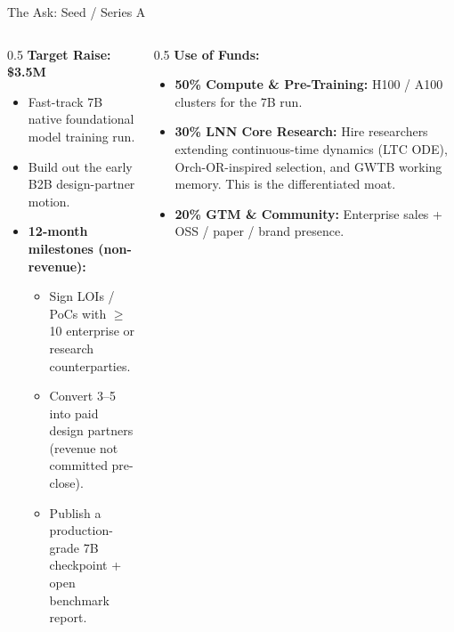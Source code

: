 ﻿\documentclass[aspectratio=169, 10pt]{beamer}
\begin{document}
\begin{frame}{The Ask: Seed / Series A}
\begin{columns}
\begin{column}{0.5\textwidth}
\textbf{Target Raise: \$3.5M}
\vspace{0.5em}
\begin{itemize}
    \item Fast-track 7B native foundational model training run.
    \item Build out the early B2B design-partner motion.
    \item \textbf{12-month milestones (non-revenue):}
    \begin{itemize}\footnotesize
        \item Sign LOIs / PoCs with $\geq$ 10 enterprise or research counterparties.
        \item Convert 3--5 into paid design partners (revenue not committed pre-close).
        \item Publish a production-grade 7B checkpoint + open benchmark report.
    \end{itemize}
\end{itemize}
\end{column}
\begin{column}{0.5\textwidth}
\textbf{Use of Funds:}
\begin{itemize}
    \item \textbf{50\% Compute \& Pre-Training:} H100 / A100 clusters for the 7B run.
    \item \textbf{30\% LNN Core Research:} Hire researchers extending continuous-time dynamics (LTC ODE), Orch-OR-inspired selection, and GWTB working memory. This is the differentiated moat.
    \item \textbf{20\% GTM \& Community:} Enterprise sales + OSS / paper / brand presence.
\end{itemize}
\end{column}
\end{columns}
\end{frame}
\end{document}
